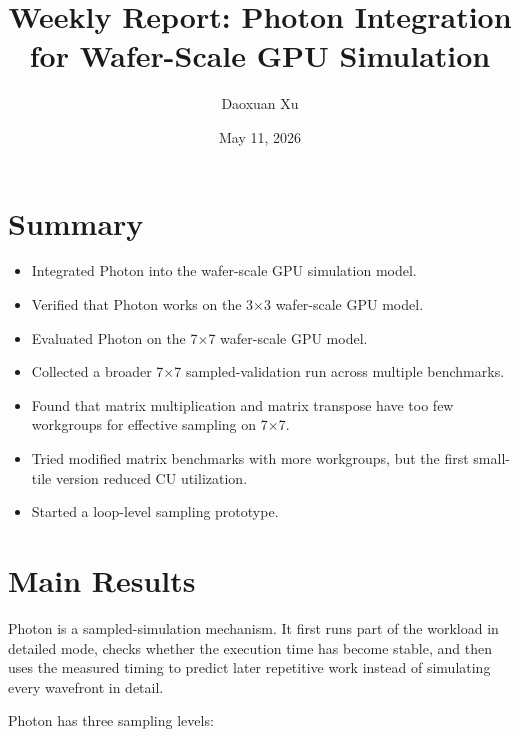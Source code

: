 \documentclass[11pt]{article}
\title{Weekly Report: Photon Integration for Wafer-Scale GPU Simulation}
\author{Daoxuan Xu}
\date{May 11, 2026}
\begin{document}
\maketitle

\section{Summary}

\begin{itemize}
  \item Integrated Photon into the wafer-scale GPU simulation model.
  \item Verified that Photon works on the 3$\times$3 wafer-scale GPU model.
  \item Evaluated Photon on the 7$\times$7 wafer-scale GPU model.
  \item Collected a broader 7$\times$7 sampled-validation run across multiple
        benchmarks.
  \item Found that matrix multiplication and matrix transpose have too few
        workgroups for effective sampling on 7$\times$7.
  \item Tried modified matrix benchmarks with more workgroups, but the first
        small-tile version reduced CU utilization.
  \item Started a loop-level sampling prototype.
\end{itemize}

\section{Main Results}

Photon is a sampled-simulation mechanism. It first runs part of the workload in
detailed mode, checks whether the execution time has become stable, and then
uses the measured timing to predict later repetitive work instead of simulating
every wavefront in detail.

Photon has three sampling levels:
\end{document}
